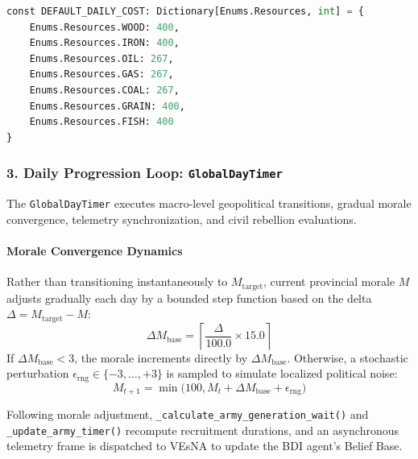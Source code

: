\begin{lstlisting}[language=python, caption={Default daily provincial maintenance costs across strategic commodities.}, label={lst:daily_cost_dict}]
const DEFAULT_DAILY_COST: Dictionary[Enums.Resources, int] = {
    Enums.Resources.WOOD: 400,
    Enums.Resources.IRON: 400,
    Enums.Resources.OIL: 267,
    Enums.Resources.GAS: 267,
    Enums.Resources.COAL: 267,
    Enums.Resources.GRAIN: 400,
    Enums.Resources.FISH: 400
}
\end{lstlisting}

\subsubsection{3. Daily Progression Loop: \texttt{GlobalDayTimer}}
The \texttt{GlobalDayTimer} executes macro-level geopolitical transitions, gradual morale convergence, telemetry synchronization, and civil rebellion evaluations.

\paragraph{Morale Convergence Dynamics}
Rather than transitioning instantaneously to $M_{\text{target}}$, current provincial morale $M$ adjusts gradually each day by a bounded step function based on the delta $\Delta = M_{\text{target}} - M$:
\begin{equation}
    \Delta M_{\text{base}} = \left\lceil \frac{\Delta}{100.0} \times 15.0 \right\rceil
\end{equation}
If $\Delta M_{\text{base}} < 3$, the morale increments directly by $\Delta M_{\text{base}}$. Otherwise, a stochastic perturbation $\epsilon_{\text{rng}} \in \{-3, \dots, +3\}$ is sampled to simulate localized political noise:
\begin{equation}
    M_{t+1} = \min\big(100, M_t + \Delta M_{\text{base}} + \epsilon_{\text{rng}}\big)
\end{equation}

Following morale adjustment, \texttt{\_calculate\_army\_generation\_wait()} and \texttt{\_update\_army\_timer()} recompute recruitment durations, and an asynchronous telemetry frame is dispatched to VEsNA to update the BDI agent's Belief Base.


